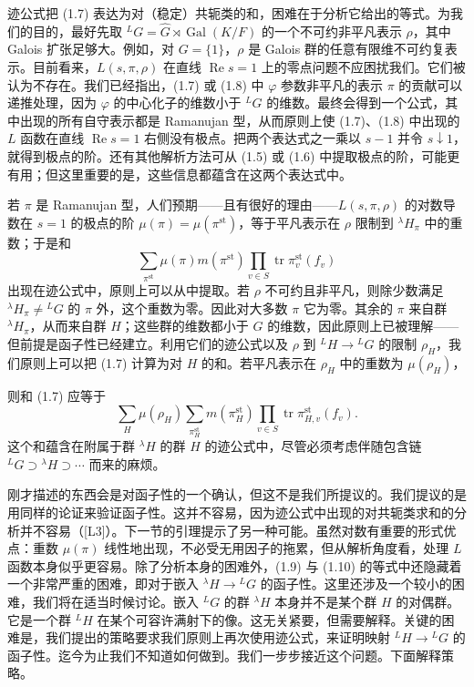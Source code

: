 迹公式把 (1.7) 表达为对（稳定）共轭类的和，困难在于分析它给出的等式。为我们的目的，最好先取 ${}^LG=\hat G\rtimes\operatorname{Gal}(K/F)$ 的一个不可约非平凡表示 $\rho$，其中 Galois 扩张足够大。例如，对 $G=\{1\}$，$\rho$ 是 Galois 群的任意有限维不可约复表示。目前看来，$L(s,\pi,\rho)$ 在直线 $\operatorname{Re}s=1$ 上的零点问题不应困扰我们。它们被认为不存在。我们已经指出，(1.7) 或 (1.8) 中 $\varphi$ 参数非平凡的表示 $\pi$ 的贡献可以递推处理，因为 $\varphi$ 的中心化子的维数小于 ${}^LG$ 的维数。最终会得到一个公式，其中出现的所有自守表示都是 Ramanujan 型，从而原则上使 (1.7)、(1.8) 中出现的 $L$ 函数在直线 $\operatorname{Re}s=1$ 右侧没有极点。把两个表达式之一乘以 $s-1$ 并令 $s\downarrow1$，就得到极点的阶。还有其他解析方法可从 (1.5) 或 (1.6) 中提取极点的阶，可能更有用；但这里重要的是，这些信息都蕴含在这两个表达式中。

若 $\pi$ 是 Ramanujan 型，人们预期——且有很好的理由——$L(s,\pi,\rho)$ 的对数导数在 $s=1$ 的极点的阶 $\mu(\pi)=\mu(\pi^{\mathrm{st}})$，等于平凡表示在 $\rho$ 限制到 ${}^{\lambda}H_\pi$ 中的重数；于是和
\begin{equation}\tag{1.9}
\sum_{\pi^{\mathrm{st}}}\mu(\pi)m(\pi^{\mathrm{st}})\prod_{v\in S}\operatorname{tr}\pi^{\mathrm{st}}_v(f_v)
\end{equation}
出现在迹公式中，原则上可以从中提取。若 $\rho$ 不可约且非平凡，则除少数满足 ${}^{\lambda}H_\pi\ne{}^LG$ 的 $\pi$ 外，这个重数为零。因此对大多数 $\pi$ 它为零。其余的 $\pi$ 来自群 ${}^{\lambda}H_\pi$，从而来自群 $H$；这些群的维数都小于 $G$ 的维数，因此原则上已被理解——但前提是函子性已经建立。利用它们的迹公式以及 $\rho$ 到 ${}^LH\to{}^LG$ 的限制 $\rho_H$，我们原则上可以把 (1.7) 计算为对 $H$ 的和。若平凡表示在 $\rho_H$ 中的重数为 $\mu(\rho_H)$，

则和 (1.7) 应等于
\begin{equation}\tag{1.10}
\sum_H\mu(\rho_H)\sum_{\pi^{\mathrm{st}}_H}m(\pi^{\mathrm{st}}_H)
\prod_{v\in S}\operatorname{tr}\pi^{\mathrm{st}}_{H,v}(f_v).
\end{equation}
这个和蕴含在附属于群 ${}^{\lambda}H$ 的群 $H$ 的迹公式中，尽管必须考虑伴随包含链 ${}^LG\supset{}^{\lambda}H\supset\cdots$ 而来的麻烦。

刚才描述的东西会是对函子性的一个确认，但这不是我们所提议的。我们提议的是用同样的论证来验证函子性。这并不容易，因为迹公式中出现的对共轭类求和的分析并不容易（[L3]）。下一节的引理提示了另一种可能。虽然对数有重要的形式优点：重数 $\mu(\pi)$ 线性地出现，不必受无用因子的拖累，但从解析角度看，处理 $L$ 函数本身似乎更容易。除了分析本身的困难外，(1.9) 与 (1.10) 的等式中还隐藏着一个非常严重的困难，即对于嵌入 ${}^{\lambda}H\to{}^LG$ 的函子性。这里还涉及一个较小的困难，我们将在适当时候讨论。嵌入 ${}^LG$ 的群 ${}^{\lambda}H$ 本身并不是某个群 $H$ 的对偶群。它是一个群 ${}^LH$ 在某个可容许满射下的像。这无关紧要，但需要解释。关键的困难是，我们提出的策略要求我们原则上再次使用迹公式，来证明映射 ${}^LH\to{}^LG$ 的函子性。迄今为止我们不知道如何做到。我们一步步接近这个问题。下面解释策略。

